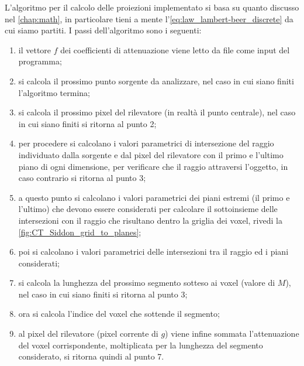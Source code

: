 \documentclass[12pt,a4paper]{report}
\begin{document}
L'algoritmo per il calcolo delle proiezioni implementato si basa su quanto discusso nel \autoref{chap:math}, in particolare tieni
a mente l'\autoref{eq:law_lambert-beer_discrete} da cui siamo partiti. I passi dell'algoritmo sono i seguenti:
\begin{enumerate}
  \item il vettore \(f\) dei coefficienti di attenuazione viene letto da file come input del programma;
  \item si calcola il prossimo punto sorgente da analizzare, nel caso in cui siano finiti l'algoritmo termina;
  \item si calcola il prossimo pixel del rilevatore (in realtà il punto centrale), nel caso in cui siano finiti si ritorna al
        punto 2;
  \item per procedere si calcolano i valori parametrici di intersezione del raggio individuato dalla sorgente e dal pixel del
        rilevatore con il primo e l'ultimo piano di ogni dimensione, per verificare che il raggio attraversi l'oggetto, in caso
        contrario si ritorna al punto 3;
  \item a questo punto si calcolano i valori parametrici dei piani estremi (il primo e l'ultimo) che devono essere considerati per
        calcolare il sottoinsieme delle intersezioni con il raggio che risultano dentro la griglia dei voxel, rivedi la
        \autoref{fig:CT_Siddon_grid_to_planes};
  \item poi si calcolano i valori parametrici delle intersezioni tra il raggio ed i piani considerati;
  \item si calcola la lunghezza del prossimo segmento sotteso ai voxel (valore di \(M\)), nel caso in cui siano finiti si ritorna
        al punto 3;
  \item ora si calcola l'indice del voxel che sottende il segmento;
  \item al pixel del rilevatore (pixel corrente di \(g\)) viene infine sommata l'attenuazione del voxel corrispondente,
        moltiplicata per la lunghezza del segmento considerato, si ritorna quindi al punto 7.
\end{enumerate}
\end{document}
